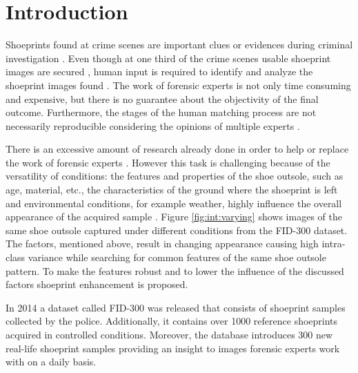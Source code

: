 \documentclass[draft,final]{vutinfth} %
\begin{document}
\chapter{Introduction}
\raggedbottom
\par
Shoeprints found at crime scenes are important clues or evidences during criminal investigation \cite{kong2014novel}.
Even though at one third of the crime scenes usable shoeprint images are secured \cite{alexandre1996computerized}, human input is required to identify and analyze the shoeprint images  found \cite{wang2014automatic}.
The work of forensic experts is not only time consuming and expensive, but there is no guarantee about the objectivity of the final outcome\cite{gueham2008automatic}.
Furthermore, the stages of the human matching process are not necessarily reproducible considering the opinions of multiple experts \cite{damary2018dependence}.
\par
There is an excessive amount of research already done in order to help or replace the work of forensic experts \cite{rida2019forensic}.
However this task is challenging because of the versatility of conditions: the features and properties of the shoe outsole, such as age, material, etc., the characteristics of the ground where the shoeprint is left and environmental conditions, for example weather, highly influence the overall appearance of the acquired sample \cite{kortylewski2014unsupervised}.
Figure \ref{fig:int:varying} shows images of the same shoe outsole captured under different conditions from the FID-300 \cite{kortylewski2014unsupervised} dataset.
The factors, mentioned above, result in changing appearance causing high intra-class variance while searching for common features of the same shoe outsole pattern.
To make the features robust and to lower the influence of the discussed factors shoeprint enhancement is proposed.
\par
In 2014 a dataset called FID-300 \cite{kortylewski2014unsupervised} was released that consists of shoeprint samples collected by the police. 
Additionally, it contains over 1000 reference shoeprints acquired in controlled conditions.
Moreover, the database introduces 300 new real-life shoeprint samples providing an insight to images forensic experts work with on a daily basis.
\end{document}
